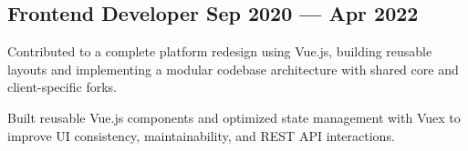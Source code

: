 
\subsection{{Frontend Developer \hfill Sep 2020 --- Apr 2022}}
\begin{zitemize}
\item Contributed to a complete platform redesign using Vue.js, building reusable layouts and implementing a modular codebase architecture with shared core and client-specific forks.
\item Built reusable Vue.js components and optimized state management with Vuex to improve UI consistency, maintainability, and REST API interactions.
\end{zitemize}

